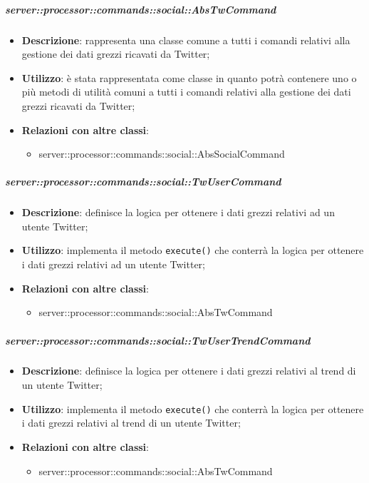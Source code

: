 
        \subparagraph{server::processor::commands::social::AbsTwCommand} %
        \label{subp:bdsm_app_server_processor_commands_social::abstwcommand}
        \begin{itemize}
          \item \textbf{Descrizione}: rappresenta una classe comune a tutti i comandi relativi alla gestione dei dati grezzi ricavati da Twitter;
          \item \textbf{Utilizzo}: è stata rappresentata come classe in quanto potrà contenere uno o più metodi di utilità comuni a tutti i comandi relativi alla gestione dei dati grezzi ricavati da Twitter;
          \item \textbf{Relazioni con altre classi}:
            \begin{itemize}
              \item server::processor::commands::social::AbsSocialCommand
            \end{itemize}
        \end{itemize}

        \subparagraph{server::processor::commands::social::TwUserCommand} %
        \label{subp:bdsm_app_server_processor_commands_social_twusercommand}
        \begin{itemize}
          \item \textbf{Descrizione}: definisce la logica per ottenere i dati grezzi relativi ad un utente Twitter;
          \item \textbf{Utilizzo}: implementa il metodo \texttt{execute()} che conterrà la logica per ottenere i dati grezzi relativi ad un utente Twitter;
          \item \textbf{Relazioni con altre classi}:
            \begin{itemize}
              \item server::processor::commands::social::AbsTwCommand
            \end{itemize}
        \end{itemize}

        \subparagraph{server::processor::commands::social::TwUserTrendCommand} %
        \label{subp:bdsm_app_server_processor_commands_social_twusertrendcommand}
        \begin{itemize}
          \item \textbf{Descrizione}: definisce la logica per ottenere i dati grezzi relativi al trend di un utente Twitter;
          \item \textbf{Utilizzo}: implementa il metodo \texttt{execute()} che conterrà la logica per ottenere i dati grezzi relativi al trend di un utente Twitter;
          \item \textbf{Relazioni con altre classi}:
            \begin{itemize}
              \item server::processor::commands::social::AbsTwCommand
            \end{itemize}
        \end{itemize}

